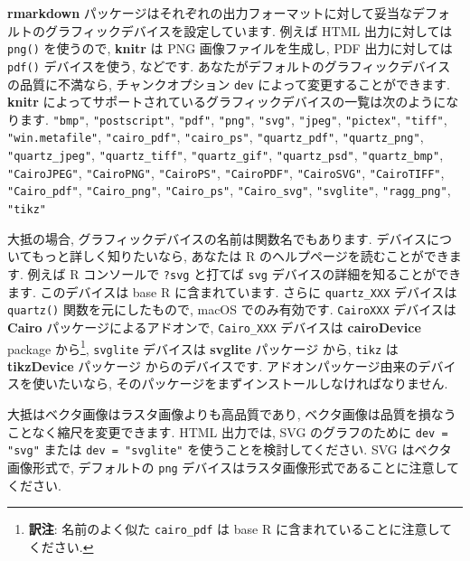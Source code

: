 \documentclass[
  11pt,
  lualatex,ja=standard,jafont=noto]{bxjsreport}
\begin{document}
\textbf{rmarkdown} パッケージはそれぞれの出力フォーマットに対して妥当なデフォルトのグラフィックデバイスを設定しています. 例えば HTML 出力に対しては \texttt{png()} を使うので, \textbf{knitr} は PNG 画像ファイルを生成し, PDF 出力に対しては \texttt{pdf()} デバイスを使う, などです. あなたがデフォルトのグラフィックデバイスの品質に不満なら, チャンクオプション \texttt{dev} によって変更することができます. \textbf{knitr} によってサポートされているグラフィックデバイスの一覧は次のようになります. \texttt{"bmp"}, \texttt{"postscript"}, \texttt{"pdf"}, \texttt{"png"}, \texttt{"svg"}, \texttt{"jpeg"}, \texttt{"pictex"}, \texttt{"tiff"}, \texttt{"win.metafile"}, \texttt{"cairo\_pdf"}, \texttt{"cairo\_ps"}, \texttt{"quartz\_pdf"}, \texttt{"quartz\_png"}, \texttt{"quartz\_jpeg"}, \texttt{"quartz\_tiff"}, \texttt{"quartz\_gif"}, \texttt{"quartz\_psd"}, \texttt{"quartz\_bmp"}, \texttt{"CairoJPEG"}, \texttt{"CairoPNG"}, \texttt{"CairoPS"}, \texttt{"CairoPDF"}, \texttt{"CairoSVG"}, \texttt{"CairoTIFF"}, \texttt{"Cairo\_pdf"}, \texttt{"Cairo\_png"}, \texttt{"Cairo\_ps"}, \texttt{"Cairo\_svg"}, \texttt{"svglite"}, \texttt{"ragg\_png"}, \texttt{"tikz"}

大抵の場合, グラフィックデバイスの名前は関数名でもあります. デバイスについてもっと詳しく知りたいなら, あなたは R のヘルプページを読むことができます. 例えば R コンソールで \texttt{?svg} と打てば \texttt{svg} デバイスの詳細を知ることができます. このデバイスは base R に含まれています. さらに \texttt{quartz\_XXX} デバイスは \texttt{quartz()} 関数を元にしたもので, macOS でのみ有効です. \texttt{CairoXXX} デバイスは \textbf{Cairo} \autocite{R-Cairo} パッケージによるアドオンで, \texttt{Cairo\_XXX} デバイスは \textbf{cairoDevice} package \autocite{R-cairoDevice} から\footnote{\textbf{訳注}: 名前のよく似た \texttt{cairo\_pdf} は base R に含まれていることに注意してください.}, \texttt{svglite} デバイスは \textbf{svglite} パッケージ \autocite{R-svglite} から, \texttt{tikz} は \textbf{tikzDevice} パッケージ \autocite{R-tikzDevice} からのデバイスです. アドオンパッケージ由来のデバイスを使いたいなら, そのパッケージをまずインストールしなければなりません.

大抵はベクタ画像はラスタ画像よりも高品質であり, ベクタ画像は品質を損なうことなく縮尺を変更できます. HTML 出力では, SVG のグラフのために \texttt{dev = "svg"} または \texttt{dev = "svglite"} を使うことを検討してください. SVG はベクタ画像形式で, デフォルトの \texttt{png} デバイスはラスタ画像形式であることに注意してください.
\end{document}
